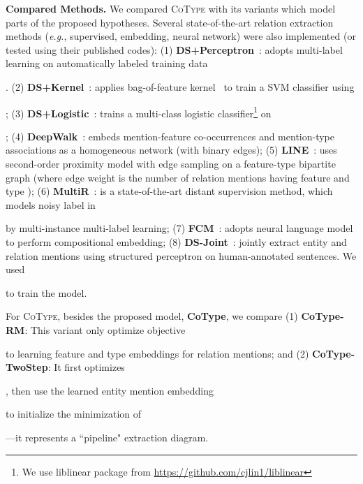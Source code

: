 \documentclass[letterpaper]{sig-alternate-2013}
\def\eg{{\sl e.g.}}
\begin{document}
\smallskip\noindent
\textsf{\small\textbf{Compared Methods.}}
We compared \textsc{CoType} with its variants which model parts of the proposed hypotheses. Several state-of-the-art relation extraction methods (\eg, supervised, embedding, neural network) were also implemented (or tested using their published codes):
(1) \textbf{\small DS+Perceptron}~\cite{ling2012fine}: adopts multi-label learning on automatically labeled training data \begin{small}\end{small}.
(2) \textbf{\small DS+Kernel}~\cite{mooney2005subsequence}: applies bag-of-feature kernel~\cite{mooney2005subsequence} to train a SVM classifier using \begin{small}\end{small};
(3) \textbf{\small DS+Logistic}~\cite{mintz2009distant}: trains a multi-class logistic classifier\footnote{\scriptsize  We use liblinear package from \url{https://github.com/cjlin1/liblinear}} on \begin{small}\end{small};
(4) \textbf{\small DeepWalk}~\cite{perozzi2014deepwalk}: embeds mention-feature co-occurrences and mention-type associations as a homogeneous network (with binary edges);
(5) \textbf{\small LINE}~\cite{tang2015line}:
uses second-order proximity model with edge sampling on a feature-type bipartite graph (where edge weight  is the number of relation mentions having feature  and type );
(6) \textbf{\small MultiR}~\cite{hoffmann2011multiR}: is a state-of-the-art distant supervision method, which models noisy label in \begin{small}\end{small} by multi-instance multi-label learning;
(7) \textbf{\small FCM}~\cite{gormley2015improved}: adopts neural language model to perform compositional embedding;
(8) \textbf{\small DS-Joint}~\cite{li2014incremental}: jointly extract entity and relation mentions using structured perceptron on human-annotated sentences. We used \begin{small}\end{small} to train the model.

For \textsc{CoType}, besides the proposed model, \textbf{\small CoType}, we compare (1) \textbf{\small CoType-RM}: This variant only optimize objective \begin{small}\end{small} to learning feature and type embeddings for relation mentions; and (2) \textbf{\small CoType-TwoStep}: It first optimizes \begin{small}\end{small}, then use the learned entity mention embedding \begin{small}\end{small} to initialize the minimization of \begin{small}\end{small}---it represents a ``pipeline" extraction diagram.
\end{document}
